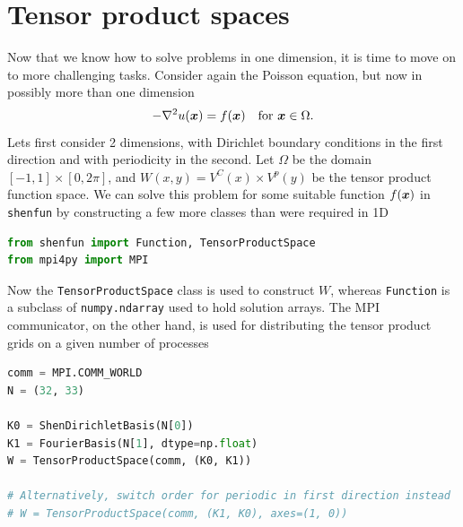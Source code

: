 \documentclass[%
oneside,                 %
final,                   %
10pt]{article}
\begin{document}
\section{Tensor product spaces}
\label{sec:tensorproductspaces}
Now that we know how to solve problems in one dimension, it is time to move on to more challenging tasks. Consider again the Poisson equation, but now in possibly more than one dimension
\begin{equation}
 -\nabla^2 u(\boldsymbol{x}) = f(\boldsymbol{x}) \quad \text{for }\boldsymbol{x} \in \Omega.
\end{equation}
Lets first consider 2 dimensions, with Dirichlet boundary conditions in the first direction and with periodicity in the second. Let $\Omega$ be the domain $[-1, 1] \times [0, 2 \pi]$, and $W(x,y) = V^C(x) \times V^p(y)$ be the tensor product function space. We can solve this problem for some suitable function $f(\boldsymbol{x})$ in \texttt{shenfun} by constructing a few more classes than were required in 1D
\begin{lstlisting}[language=Python,style=yellow2_fb]
from shenfun import Function, TensorProductSpace
from mpi4py import MPI
\end{lstlisting}
Now the \texttt{TensorProductSpace} class is used to construct $W$, whereas \texttt{Function} is a subclass of \texttt{numpy.ndarray} used to hold solution arrays. The MPI communicator, on the other hand, is used for distributing the tensor product grids on a given number of processes
\begin{lstlisting}[language=Python,style=yellow2_fb]
comm = MPI.COMM_WORLD
N = (32, 33)

K0 = ShenDirichletBasis(N[0])
K1 = FourierBasis(N[1], dtype=np.float)
W = TensorProductSpace(comm, (K0, K1))

# Alternatively, switch order for periodic in first direction instead
# W = TensorProductSpace(comm, (K1, K0), axes=(1, 0))
\end{lstlisting}
\end{document}
